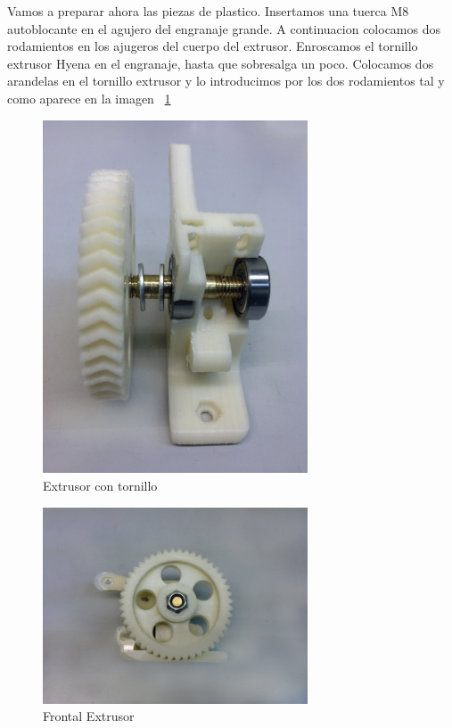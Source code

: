 				Vamos a preparar ahora las piezas de plastico. Insertamos una tuerca M8 autoblocante en el agujero del engranaje grande. A continuacion colocamos dos rodamientos en los ajugeros del cuerpo del extrusor. Enroscamos el tornillo extrusor Hyena en el	engranaje, hasta que sobresalga un poco. Colocamos dos arandelas en el tornillo extrusor y lo introducimos por los dos rodamientos tal y como aparece en la imagen ~\ref{fig:1.ext}
			\begin{figure}[!htp]
				\centering
				\includegraphics[width=0.7\textwidth]{../../Fotos/98.jpg}
				\caption{Extrusor con tornillo}
				\label{fig:1.ext}
			\end{figure}
			\begin{figure}[!htp]
				\centering
			\includegraphics[width=0.7\textwidth]{../../Fotos/99.jpg}
			\caption{Frontal Extrusor}
			\label{fig:2.ext}
		\end{figure}
